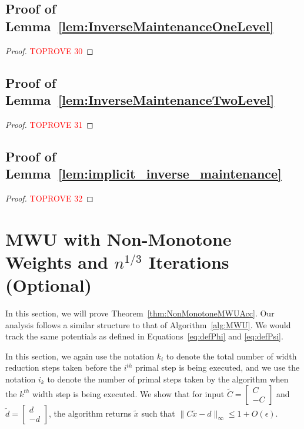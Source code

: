 \documentclass[11pt]{article}
\newcommand\dd{\boldsymbol{\mathit{d}}}
\newcommand\xx{\boldsymbol{\mathit{x}}}
\newcommand\CC{\boldsymbol{\mathit{C}}}
\newcommand{\wt}{\widetilde}
\begin{document}
\subsection*{Proof of Lemma~\ref{lem:InverseMaintenanceOneLevel}}

\begin{proof}\textcolor{red}{TOPROVE 30}\end{proof}

\subsection*{Proof of Lemma~\ref{lem:InverseMaintenanceTwoLevel}}

\begin{proof}\textcolor{red}{TOPROVE 31}\end{proof}


\subsection*{Proof of Lemma~\ref{lem:implicit_inverse_maintenance}}
\begin{proof}\textcolor{red}{TOPROVE 32}\end{proof}
 
\section{MWU with Non-Monotone Weights and \texorpdfstring{$n^{1/3}$}{TEXT} Iterations (Optional)}\label{sec:NonMonMWU}


In this section, we will prove Theorem~\ref{thm:NonMonotoneMWUAcc}. Our analysis follows a similar structure to that of Algorithm~\ref{alg:MWU}. We would track the same potentials as defined in Equations~\eqref{eq:defPhi} and \eqref{eq:defPsi}. 

In this section, we again use the notation $k_i$ to denote the total number of width reduction steps taken before the $i^{th}$ primal step is being executed, and we use the notation $i_k$ to denote the number of primal steps taken by the algorithm when the $k^{th}$ width step is being executed. We show that for input $\wt{\CC} = \begin{bmatrix}\CC\\ -\CC    \end{bmatrix}$ and $\wt{\dd} = \begin{bmatrix}
   \dd\\ -\dd
\end{bmatrix}$, the algorithm returns $\wt{\xx}$ such that $\|\CC\wt{\xx}-\dd\|_{\infty}\leq 1+ O(\epsilon)$.
\end{document}
